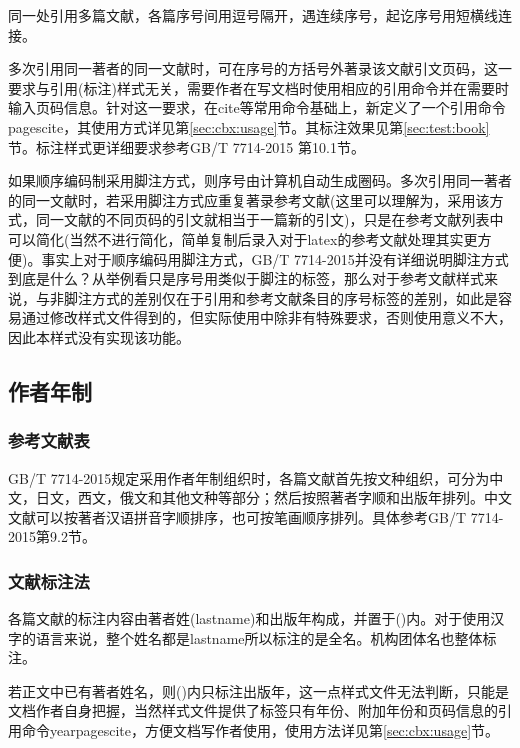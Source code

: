 同一处引用多篇文献，各篇序号间用逗号隔开，遇连续序号，起讫序号用短横线连接。

多次引用同一著者的同一文献时，可在序号的方括号外著录该文献引文页码，这一要求与引用(标注)样式无关，需要作者在写文档时使用相应的引用命令并在需要时输入页码信息。针对这一要求，在cite等常用命令基础上，新定义了一个引用命令pagescite，其使用方式详见第\ref{sec:cbx:usage}节。其标注效果见第\ref{sec:test:book}节。标注样式更详细要求参考GB/T 7714-2015 第10.1节。

如果顺序编码制采用脚注方式，则序号由计算机自动生成圈码。多次引用同一著者的同一文献时，若采用脚注方式应重复著录参考文献(这里可以理解为，采用该方式，同一文献的不同页码的引文就相当于一篇新的引文)，只是在参考文献列表中可以简化(当然不进行简化，简单复制后录入对于latex的参考文献处理其实更方便)。事实上对于顺序编码用脚注方式，GB/T 7714-2015并没有详细说明脚注方式到底是什么？从举例看只是序号用类似于脚注的标签，那么对于参考文献样式来说，与非脚注方式的差别仅在于引用和参考文献条目的序号标签的差别，如此是容易通过修改样式文件得到的，但实际使用中除非有特殊要求，否则使用意义不大，因此本样式没有实现该功能。

\subsection{作者年制}

\subsubsection{参考文献表}

GB/T 7714-2015规定采用作者年制组织时，各篇文献首先按文种组织，可分为中文，日文，西文，俄文和其他文种等部分；然后按照著者字顺和出版年排列。中文文献可以按著者汉语拼音字顺排序，也可按笔画顺序排列。具体参考GB/T 7714-2015第9.2节。


\subsubsection{文献标注法}
各篇文献的标注内容由著者姓(lastname)和出版年构成，并置于()内。对于使用汉字的语言来说，整个姓名都是lastname所以标注的是全名。机构团体名也整体标注。

若正文中已有著者姓名，则()内只标注出版年，这一点样式文件无法判断，只能是文档作者自身把握，当然样式文件提供了标签只有年份、附加年份和页码信息的引用命令yearpagescite，方便文档写作者使用，使用方法详见第\ref{sec:cbx:usage}节。

